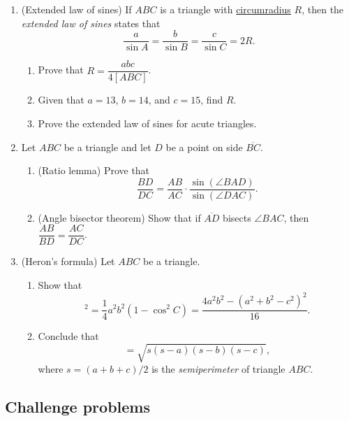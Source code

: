 \begin{enumerate}
\begin{enumerate}
\end{enumerate}
\item (Extended law of sines) If $ABC$ is a triangle with \href{https://en.wikipedia.org/wiki/Circumcircle}{circumradius} $R$, then the \emph{extended law of sines} states that
\begin{equation*}
\frac{a}{\sin A} = \frac{b}{\sin B} = \frac{c}{\sin C} = 2R.
\end{equation*}
\begin{enumerate}
\item Prove that $R = \dfrac{abc}{4[ABC]}$.
\item Given that $a = 13$, $b = 14$, and $c = 15$, find $R$.
\item Prove the extended law of sines for acute triangles.
\end{enumerate}
\item Let $ABC$ be a triangle and let $D$ be a point on side $\overline{BC}$.
\begin{enumerate}
\item (Ratio lemma) Prove that
\begin{equation*}
\frac{BD}{DC} = \frac{AB}{AC}\cdot\frac{\sin(\angle BAD)}{\sin(\angle DAC)}.
\end{equation*}
\item (Angle bisector theorem) Show that if $\overline{AD}$ bisects $\angle BAC$, then $\dfrac{AB}{BD} = \dfrac{AC}{DC}$.
\end{enumerate}
\item (Heron's formula) Let $ABC$ be a triangle.
\begin{enumerate}
\item Show that
\begin{equation*}
[ABC]^2 = \frac{1}{4}a^2b^2(1 - \cos^2 C) = \frac{4a^2b^2 - (a^2 + b^2 - c^2)^2}{16}.
\end{equation*}
\item Conclude that
\begin{equation*}
[ABC] = \sqrt{s(s - a)(s - b)(s - c)},
\end{equation*}
where $s = (a + b + c)/2$ is the \emph{semiperimeter} of triangle $ABC$.
\end{enumerate}
\end{enumerate}


\subsection{Challenge problems}

